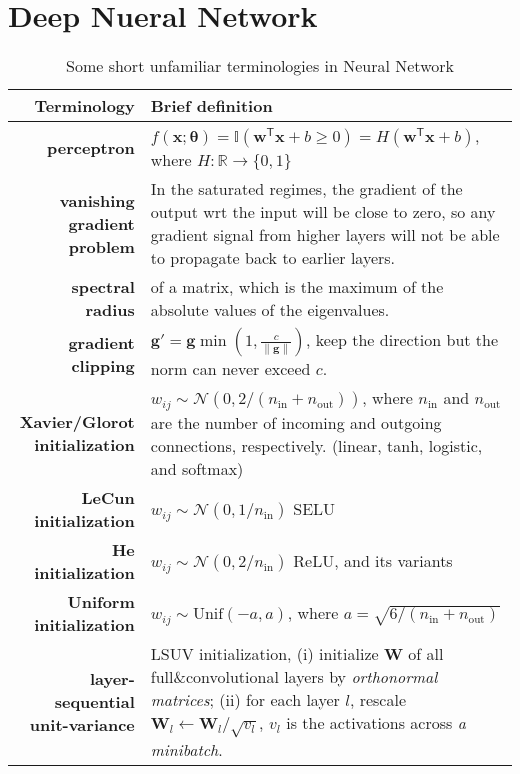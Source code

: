 \section{Deep Nueral Network}

\begin{table}[htpb]
    \centering
    \caption{Some short unfamiliar terminologies in Neural Network}
    {\footnotesize

}
    {\small
    \begin{tabular}{rp{28em}}
        \toprule
        Terminology & Brief definition \\
        \midrule
        \textbf{perceptron} & $f(\bm{x};\bm{\theta})=\mathbb{I}(\bm{w}^\mathsf{T}\bm{x}+b\geq 0)=H(\bm{w}^\mathsf{T}\bm{x}+b)$, where $H:\mathbb{R}\to\{0,1\}$ \\
        \textbf{vanishing gradient problem} & In the saturated regimes, the gradient of the output wrt the input will be close to zero, so any gradient signal from higher layers will not be able to propagate back to earlier layers. \\
        \textbf{spectral radius} & of a matrix, which is the maximum of the absolute values of the eigenvalues. \\
        \textbf{gradient clipping} & $\bm{g}'=\bm{g}\min(1,\frac{c}{\|\bm{g}\|})$, keep the direction but the norm can never exceed $c$. \\
        \textbf{Xavier/Glorot initialization} & $w_{ij}\sim\mathcal{N}(0,2/(n_\text{in}+n_\text{out}))$,
        where $n_\text{in}$ and $n_\text{out}$ are the number of incoming and outgoing connections, respectively. 
        {\color{blue}(linear, tanh, logistic, and softmax)}\\
        \textbf{LeCun initialization} & $w_{ij}\sim\mathcal{N}(0,1/n_\text{in})$ {\color{blue}SELU}\\
        \textbf{He initialization} & $w_{ij}\sim\mathcal{N}(0,2/n_\text{in})$ 
        {\color{blue}ReLU, and its variants} \\
        \textbf{Uniform initialization} & $w_{ij}\sim\mathrm{Unif}(-a,a)$, where $a=\sqrt{6/(n_\text{in}+n_\text{out})}$ \\
        \textbf{layer-sequential unit-variance} & LSUV initialization, 
        (i) initialize $\mathbf{W}$ of all full\&convolutional layers by \textit{orthonormal matrices};
        (ii) for each layer $l$, rescale $\mathbf{W}_l\leftarrow\mathbf{W}_l/\sqrt{v_l}$, $v_l$ is the activations across \textit{a minibatch}.\\

\end{tabular}}
\end{table}
